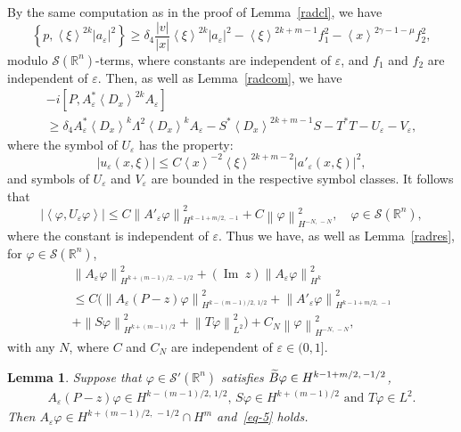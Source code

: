 \documentclass[10pt]{amsart}
\newtheorem{lemm}[cdrthm]{Lemma}
\theoremstyle{definition}
\renewcommand*\c{\gamma}
\renewcommand*\d{\delta}
\newcommand*\e{\varepsilon}
\newcommand*\f{\varphi}
\newcommand*\m{\mu}
\newcommand*\x{\xi}
\renewcommand{\L}{\Lambda}
\newcommand*\re{\mathbb{R}}
\newcommand{\clS}{\mathcal{S}}
\DeclareMathOperator{\Iml}{Im\;}
\newcommand{\jap}[1]{\left\langle #1 \right\rangle}
\newcommand{\norm}[1]{\left\| #1 \right\|}
\newcommand{\bigpare}[1]{\bigl(#1\bigr)}
\let\oldtilde\tilde
\renewcommand*{\tilde}[1]{\mathchoice{\widetilde{#1}}{\widetilde{#1}}{\oldtilde{#1}}{\oldtilde{#1}}}
\begin{document}
By the same computation as in the proof of Lemma~\ref{radcl}, we have
\[
\left\{p,\jap{\x}^{2k}|a_\e|^2\right\} \geq \d_4 \frac{|v|}{|x|} \jap{\x}^{2k}|a_\e|^2 -\jap{\x}^{2k+m-1}f_{1}^2 -\jap{x}^{2\c-1-\m}f_{2}^2,
\]
modulo $\clS(\re^n)$-terms, where constants are independent of $\e$, and $f_1$ and $f_2$ are independent of $\e$. Then, as well as Lemma~\ref{radcom}, we have
\begin{multline*}
-i\left[P, A_\e^* \jap{D_x}^{2k} A_\e\right] \\
\geq \d_4 A_\e^* \jap{D_x}^k \L^2\jap{D_x}^k A_\e -S^*\jap{D_x}^{2k+m-1}S-T^*T-U_\e -V_\e,
\end{multline*}
where the symbol of $U_\e$ has the property:
\begin{equation}\label{eq-4}
|u_\e(x,\x)|\leq C\jap{x}^{-2}\jap{\x}^{2k+m-2}\left|a'_\e(x,\x)\right|^2,
\end{equation}
and symbols of $U_\e$ and $V_\e$ are bounded in the respective symbol classes. It follows that
\[
|\jap{\f,U_\e\f}|\leq C \norm{A'_\e\f}^2_{H^{k-1+m/2,\,-1}} +C\norm{\f}^2_{H^{-N,\,-N}}, \quad \f\in\clS(\re^n),
\]
where the constant is independent of $\e$. Thus we have, as well as Lemma~\ref{radres}, for $\f\in\clS(\re^n)$,
\begin{multline}\label{eq-5}
\norm{A_\e\f}_{H^{k+(m-1)/2,\,-1/2}}^2 +(\Iml z)\norm{A_\e\f}_{H^k}^2\\
\leq C\bigpare{\norm{A_\e(P-z)\f}_{H^{k-(m-1)/2,\,1/2}}^2 +\norm{A'_\e\f}_{H^{k-1+m/2,\,-1}}^2\\
+\norm{S\f}_{H^{k+(m-1)/2}}^2 +\norm{T\f}_{L^2}^2} +C_N \norm{\f}_{H^{-N,\,-N}}^2, 
\end{multline}
with any $N$, where $C$ and $C_N$ are independent of $\e\in(0,1]$.

\begin{lemm}
Suppose that $\f\in\clS'(\re^n)$ satisfies $\tilde B\f\in H^{k-1+m/2,\,-1/2}$,
\begin{align*}
A_\e(P-z)\f\in H^{k-(m-1)/2,\,1/2},\, S\f\in H^{k+(m-1)/2}\,\, \text{and}\,\, T\f\in L^2.
\end{align*}
Then $A_\e\f\in H^{k+(m-1)/2,\,-1/2}\cap H^m$ and~\eqref{eq-5} holds.
\end{lemm}
\end{document}
